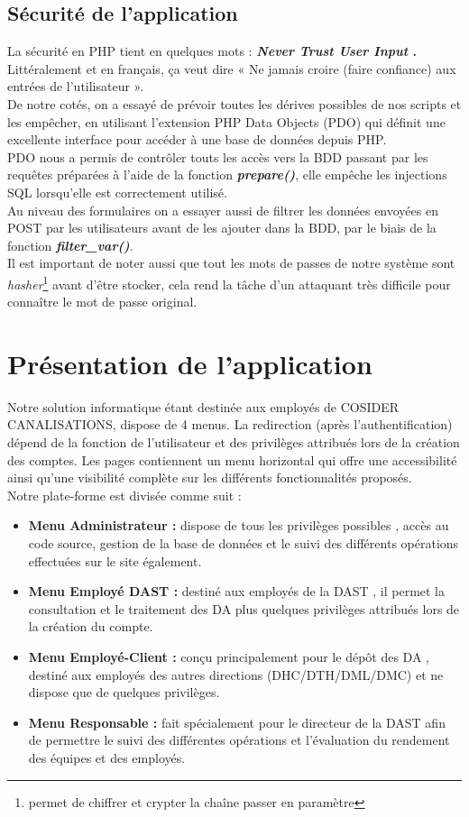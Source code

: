 \documentclass{report}
\begin{document}
\subsection{Sécurité de l'application}
La sécurité en PHP tient en quelques mots : \textbf{\emph{Never Trust User Input} .}\\
Littéralement et en français, ça veut dire « Ne jamais croire (faire confiance) aux entrées de l'utilisateur ».\\De notre cotés, on a essayé de prévoir toutes les dérives possibles de nos scripts et les
empêcher, en utilisant l'extension PHP Data Objects (PDO) qui définit une excellente interface pour accéder à une base de données depuis PHP.\\ PDO nous a permis de contrôler touts les accès vers la BDD passant par les requêtes préparées à l'aide de la fonction \textbf{\emph{prepare()}}, elle empêche les injections SQL lorsqu'elle est correctement utilisé.\\Au niveau des formulaires on a essayer aussi de filtrer les données envoyées en POST par les utilisateurs avant de les ajouter dans la BDD, par le biais de la fonction \textbf{\emph{filter\_var()}}.\\Il est important de noter aussi que tout les mots de passes de notre système sont \emph{hasher}\footnote{permet de chiffrer et crypter la chaîne passer en paramètre} avant d'être stocker, cela rend la tâche d'un attaquant très difficile pour connaître le mot de passe original.
\section{Présentation de l'application}

Notre solution informatique étant destinée aux employés de COSIDER CANALISATIONS, dispose de 4 menus. La redirection (après l’authentification) dépend de la fonction de l’utilisateur et des privilèges attribués lors de la création des comptes. Les pages contiennent un menu horizontal qui offre une accessibilité ainsi qu’une  visibilité complète sur les différents fonctionnalités proposés.\\
Notre plate-forme est divisée comme suit :
\begin{itemize}
    \item \textbf{Menu Administrateur :} dispose de tous les privilèges possibles , accès au code source, gestion de la base de données et le suivi des différents opérations effectuées sur le site également.
    \item \textbf{Menu Employé DAST :} destiné aux employés de la DAST , il permet la consultation et le traitement des DA plus quelques privilèges attribués lors de la création du compte.
    \item \textbf{Menu Employé-Client :} conçu principalement pour le dépôt des DA , destiné aux employés des autres directions (DHC/DTH/DML/DMC) et ne dispose que de quelques privilèges.
    \item \textbf{Menu Responsable :} fait spécialement pour le directeur de la DAST afin de permettre le suivi des différentes opérations et l'évaluation du rendement des équipes et des employés. 
\end{itemize}
\end{document}

